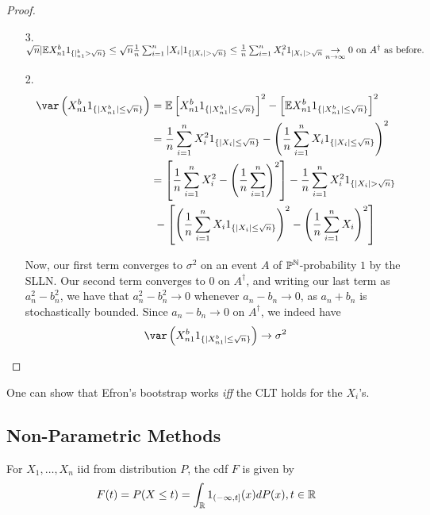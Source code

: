 \documentclass[a4paper]{article}
\begin{document}
\begin{proof}
\begin{enumerate}
\item[3.] $\sqrt{n} |\mathbb{E} X_{n1}^{b} 1_{\{|_{n1}^{b} > \sqrt{n} \} }  \le  \sqrt{n} \frac{1}{n}\sum_{i=1}^{n} |X_i| 1_{\{|X_i| > \sqrt{n} \} } \le \frac{1}{n} \sum_{i=1}^{n} X_i^2 1_{|X_i| > \sqrt{n} } \underset{n\to \infty}{\to }0 \text{ on } A^{\dagger} \text{ as before.}$

\item[2.] \begin{align*}
		\var \left( X_{n1}^{b} 1_{\{|X_{n1}^{b}| \le \sqrt{n} \} } \right) &= \E \left[X_{n1}^{b} 1_{\{|X_{n1}^{b}| \le \sqrt{n} \} }  \right]^2 - \left[ \E X_{n1}^{b} 1_{\{|X_{n1}^{b}| \le  \sqrt{n} \} } \right]^2   \\
		&= \frac{1}{n} \sum_{i=1}^{n} X_i^{2} 1_{\{|X_i| \le \sqrt{n} \}} - \left( \frac{1}{n}\sum_{i=1}^{n} X_i 1_{\{|X_i| \le \sqrt{n} \} } \right)^2 \\
		&= \left[ \frac{1}{n} \sum_{i=1}^{n} X_i^2 - \left(\frac{1}{n}\sum_{i=1}^{n}\right)^2 \right] - \frac{1}{n} \sum_{i=1}^{n} X_i^2 1_{\{|X_i| > \sqrt{n} \} } \\
		&\text{  }- \left[ \left(\frac{1}{n} \sum_{i=1}^{n} X_i 1_{\{|X_i|\le \sqrt{n} \} }\right)^2 - \left( \frac{1}{n}\sum_{i=1}^{n} X_i \right)^2  \right] \\
	\end{align*}

	Now, our first term converges to $\sigma^2$ on an event $A$ of $\mathbb{P}^{\mathbb{N}}$-probability $1$ by the SLLN. Our second term converges to $0$ on $A^{\dagger}$, and writing our last term as $a_n^2 - b_n^2$, we have that  $a_n^2 - b_n^2 \to 0$ whenever $a_n - b_n \to 0$, as $a_n + b_n$ is stochastically bounded. Since $a_n - b_n \to 0$ on $A^{\dagger}$, we indeed have 
	\[
		\var \left( X_{n1}^{b} 1_{\{|X_{n1}^{b}| \le \sqrt{n} \} } \right) \to \sigma^2
	\]
\end{enumerate}
\end{proof}

\begin{remark}
	One can show that Efron's bootstrap works \textit{iff} the CLT holds for the $X_i$'s. 
\end{remark}

\subsection{Non-Parametric Methods}

For $X_1, \ldots, X_n$ iid from distribution $P$, the cdf $F$ is given by
\[
	F(t) = P(X\le t) = \int_{\mathbb{R}} 1_{(-\infty, t]}(x) dP(x), t\in \mathbb{R}
\] 
\end{document}

